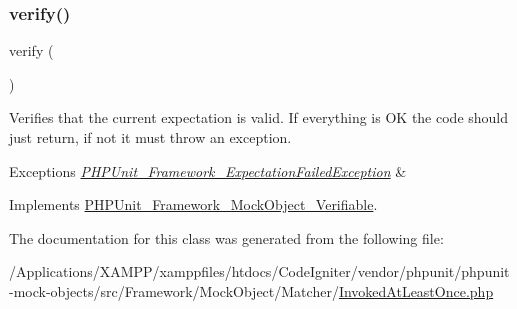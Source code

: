 \subsubsection{\texorpdfstring{verify()}{verify()}}
{\footnotesize\ttfamily verify (\begin{DoxyParamCaption}{ }\end{DoxyParamCaption})}

Verifies that the current expectation is valid. If everything is OK the code should just return, if not it must throw an exception.


\begin{DoxyExceptions}{Exceptions}
{\em \mbox{\hyperlink{class_p_h_p_unit___framework___expectation_failed_exception}{P\+H\+P\+Unit\+\_\+\+Framework\+\_\+\+Expectation\+Failed\+Exception}}} & \\
\hline
\end{DoxyExceptions}


Implements \mbox{\hyperlink{interface_p_h_p_unit___framework___mock_object___verifiable_aa33600b6a1b28d0c4dfe4d468272aaa4}{P\+H\+P\+Unit\+\_\+\+Framework\+\_\+\+Mock\+Object\+\_\+\+Verifiable}}.



The documentation for this class was generated from the following file\+:\begin{DoxyCompactItemize}
\item 
/\+Applications/\+X\+A\+M\+P\+P/xamppfiles/htdocs/\+Code\+Igniter/vendor/phpunit/phpunit-\/mock-\/objects/src/\+Framework/\+Mock\+Object/\+Matcher/\mbox{\hyperlink{_invoked_at_least_once_8php}{Invoked\+At\+Least\+Once.\+php}}\end{DoxyCompactItemize}
